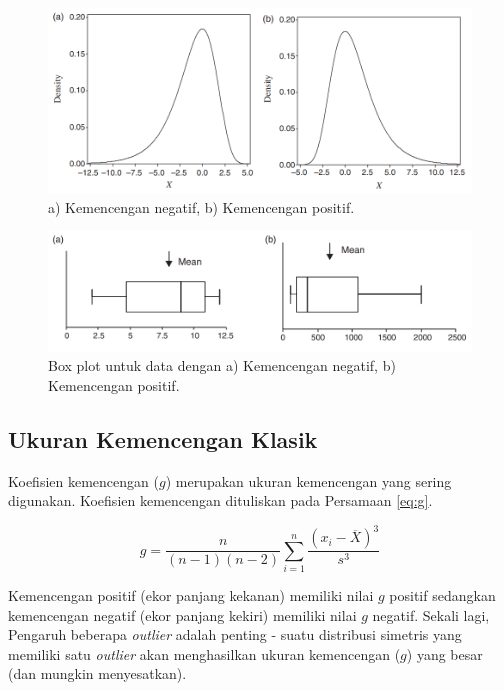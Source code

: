 \documentclass[]{book}
\begin{document}
\begin{figure}

{\centering \includegraphics[width=0.7\linewidth]{skewness} 

}

\caption{a) Kemencengan negatif, b) Kemencengan positif.}\label{fig:skew}
\end{figure}

\begin{figure}

{\centering \includegraphics[width=0.7\linewidth]{skewnessbox} 

}

\caption{Box plot untuk data dengan a) Kemencengan negatif, b) Kemencengan positif.}\label{fig:skew2}
\end{figure}

\subsection{Ukuran Kemencengan Klasik}\label{ukuran-kemencengan-klasik}

Koefisien kemencengan (\(g\)) merupakan ukuran kemencengan yang sering
digunakan. Koefisien kemencengan dituliskan pada Persamaan \eqref{eq:g}.

\begin{equation}
  g=\frac{n}{\left(n-1\right)\left(n-2\right)}\sum_{i=1}^n\frac{\left(x_i-\overline{X}\right)^3}{s^3}
  \label{eq:g}
\end{equation}

Kemencengan positif (ekor panjang kekanan) memiliki nilai \(g\) positif
sedangkan kemencengan negatif (ekor panjang kekiri) memiliki nilai \(g\)
negatif. Sekali lagi, Pengaruh beberapa \emph{outlier} adalah penting -
suatu distribusi simetris yang memiliki satu \emph{outlier} akan
menghasilkan ukuran kemencengan (\(g\)) yang besar (dan mungkin
menyesatkan).
\end{document}
